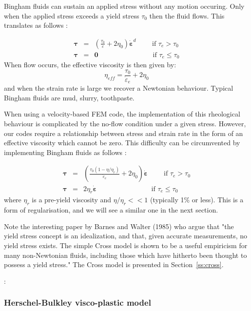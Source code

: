 Bingham fluids can sustain an applied stress without any motion occuring. Only when the applied stress exceeds
a yield stress $\tau_0$ then the fluid flows. This translates as follows \cite{reddybook2}:

\begin{eqnarray}
{\bm \tau} &=& \left(  \frac{\tau_0}{\dot{\varepsilon}} + 2 \eta_0  \right)\dot{\bm \varepsilon}^d \qquad 
\text{ if } {\tau}_{e}>\tau_0 \\
{\bm \tau} &=& {\bm 0} \qquad\qquad\qquad\qquad  \text{if } \tau_{e} \leq \tau_0 
\end{eqnarray}
When flow occurs, the effective viscosity is then given by:
\[
\eta_{eff} =  \frac{\tau_0}{\dot{\varepsilon}_e} + 2 \eta_0 
\]
and when the strain rate is large we recover a Newtonian behaviour.
Typical Bingham fluids are mud, slurry, toothpaste.  

When using a velocity-based FEM code, the implementation of this rheological behaviour 
is complicated by the no-flow condition under a given stress. However, our codes
require a relationship between stress and strain rate in the form of an effective viscosity
which cannot be zero. 
This difficulty can be circumvented by implementing Bingham fluids as follows \cite{reddybook2}:

\begin{eqnarray}
{\bm \tau} &=& \left(  \frac{\tau_0(1-\eta/\eta_r)}{\dot{\varepsilon}_e} 
+ 2 \eta_0  \right)\dot{\bm \varepsilon} \qquad \text{ if } \tau_{e}>\tau_0 \\
{\bm \tau} &=& 2 \eta_r \dot{\bm \varepsilon}  \qquad\qquad\qquad\qquad  
\text{if } \tau_{e} \leq \tau_0 
\end{eqnarray}
where $\eta_r$ is a pre-yield viscosity and $\eta/\eta_r<<1$ (typically 1\% or less). This is a form of 
regularisation, and we will see a similar one in the next section.

Note the interesting paper by Barnes and Walter (1985) \cite{bawa85} who argue that 
"the yield stress concept is an idealization, and that, given accurate
measurements, no yield stress exists. The simple Cross model is shown to be a
useful empiricism for many non-Newtonian fluids, including those which have
hitherto been thought to possess a yield stress." The Cross model is presented 
in Section~\ref{ss:cross}.
 

\Literature: \cite{papa87,blmi97,mizi01,limd02,maky17,syga14,bingham,baru09,been80,svna18}

\subsubsection{Herschel-Bulkley visco-plastic model}

